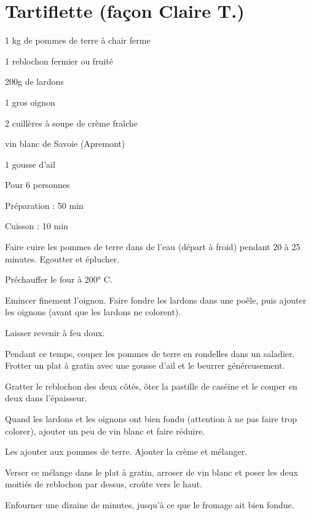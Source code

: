 \section[\normalsize{Tartiflette (façon Claire T.)}]{Tartiflette (façon Claire T.)}

\begin{ingredients}
\item 1 kg de pommes de terre \`a chair ferme
\item 1 reblochon fermier ou fruit\'e
\item 200g de lardons
\item 1 gros oignon
\item 2 cuill\`eres \`a soupe de cr\`eme fra\^iche
\item vin blanc de Savoie (Apremont)
\item 1 gousse d'ail
\end{ingredients}
\begin{infos}
\item Pour 6 personnes
\item Préparation : 50 min
\item Cuisson : 10 min
\end{infos}
\begin{etapes}
\item Faire cuire les pommes de terre dans de l'eau (d\'epart \`a froid) pendant 20 \`a 25 minutes. Egoutter et \'eplucher.
\item Pr\'echauffer le four \`a 200° C.
\item Emincer finement l'oignon. Faire fondre les lardons dans une po\^ele, puis ajouter les oignons (avant que les lardons ne colorent). 
\item Laisser revenir \`a feu doux.
\item Pendant ce temps, couper les pommes de terre en rondelles dans un saladier. Frotter un plat \`a gratin avec une gousse d'ail et le beurrer g\'en\'ereusement. 
\item Gratter le reblochon des deux côt\'es, ôter la pastille de cas\'eine et le couper en deux dans l'\'epaisseur.
\item Quand les lardons et les oignons ont bien fondu (attention \`a ne pas faire trop colorer), ajouter un peu de vin blanc et faire r\'eduire. 
\item Les ajouter aux pommes de terre. Ajouter la cr\`eme et m\'elanger.
\item Verser ce m\'elange dans le plat \`a gratin, arroser de vin blanc et poser les deux moiti\'es de reblochon par dessus, croûte vers le haut.
\item Enfourner une dizaine de minutes, jusqu'\`a ce que le fromage ait bien fondue.
\end{etapes}
\begin{conseils}
\end{conseils}
